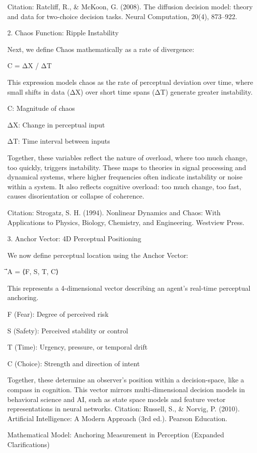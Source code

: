 \documentclass[11pt]{article}
\begin{document}
Citation: Ratcliff, R., & McKoon, G. (2008). The diffusion decision model: theory and data for two-choice decision tasks. Neural Computation, 20(4), 873–922.

2. Chaos Function: Ripple Instability

Next, we define Chaos mathematically as a rate of divergence:

C = ΔX / ΔT

This expression models chaos as the rate of perceptual deviation over time, where small shifts in data (ΔX) over short time spans (ΔT) generate greater instability.

C: Magnitude of chaos

ΔX: Change in perceptual input

ΔT: Time interval between inputs

Together, these variables reflect the nature of overload, where too much change, too quickly, triggers instability. These maps to theories in signal processing and dynamical systems, where higher frequencies often indicate instability or noise within a system. It also reflects cognitive overload: too much change, too fast, causes disorientation or collapse of coherence.

Citation: Strogatz, S. H. (1994). Nonlinear Dynamics and Chaos: With Applications to Physics, Biology, Chemistry, and Engineering. Westview Press.

3. Anchor Vector: 4D Perceptual Positioning

We now define perceptual location using the Anchor Vector:

⃗A = ⟨F, S, T, C⟩

This represents a 4-dimensional vector describing an agent’s real-time perceptual anchoring.

F (Fear): Degree of perceived risk

S (Safety): Perceived stability or control

T (Time): Urgency, pressure, or temporal drift

C (Choice): Strength and direction of intent

Together, these determine an observer’s position within a decision-space, like a compass in cognition. This vector mirrors multi-dimensional decision models in behavioral science and AI, such as state space models and feature vector representations in neural networks. Citation: Russell, S., & Norvig, P. (2010). Artificial Intelligence: A Modern Approach (3rd ed.). Pearson Education.

Mathematical Model: Anchoring Measurement in Perception (Expanded Clarifications)
\end{document}
